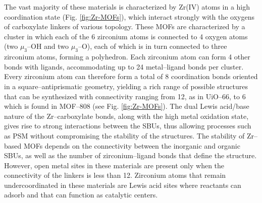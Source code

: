 The vast majority of these materials is characterized by Zr(IV) atoms in a high coordination state (Fig. \ref{fig:Zr-MOFs}), which interact strongly with the oxygens of carboxylate linkers of various topology. These MOFs are characterized by a  cluster in which each of the 6 zirconium atoms is connected to 4 oxygen atoms (two $\mu_3$--OH and two $\mu_3$--O), each of which is in turn connected to three zirconium atoms, forming a polyhedron. Each zirconium atom can form 4 other bonds with ligands, accommodating up to 24 metal--ligand bonds per cluster. Every zirconium atom can therefore form a total of 8 coordination bonds oriented in a square--antiprismatic geometry, yielding a rich range of possible structures that can be synthesized with connectivity ranging from 12, as in UiO--66\cite{cavka2008new}, to 6 which is found in MOF--808\cite{furukawa2014water} (see Fig. \ref{fig:Zr-MOFs}). The dual Lewis acid/base nature of the Zr--carboxylate bonds, along with the high metal oxidation state, gives rise to strong interactions between the SBUs, thus allowing processes such as PSM without compromising the stability of the structures. The stability of Zr--based MOFs depends on the connectivity between the inorganic and organic SBUs, as well as the number of zirconium--ligand bonds that define the structure\cite{bai2016zr}. However, open metal sites in these materials are present only when the connectivity of the linkers is less than 12. Zirconium atoms that remain undercoordinated in these materials are Lewis acid sites where reactants can adsorb and that can function as catalytic centers.


